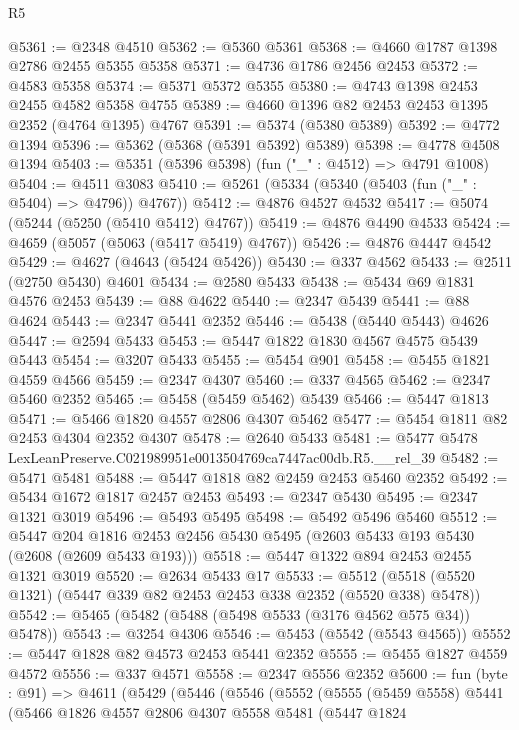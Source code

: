 \begin{lexlean}{R5}
\begin{coremodule}
@5361 := @2348 @4510
@5362 := @5360 @5361
@5368 := @4660 @1787 @1398 @2786 @2455 @5355 @5358
@5371 := @4736 @1786 @2456 @2453
@5372 := @4583 @5358
@5374 := @5371 @5372 @5355
@5380 := @4743 @1398 @2453 @2455 @4582 @5358 @4755
@5389 := @4660 @1396 @82 @2453 @2453 @1395 @2352 (@4764 @1395) @4767
@5391 := @5374 (@5380 @5389)
@5392 := @4772 @1394
@5396 := @5362 (@5368 (@5391 @5392) @5389)
@5398 := @4778 @4508 @1394
@5403 := @5351 (@5396 @5398) (fun ("_" : @4512) => @4791 @1008)
@5404 := @4511 @3083
@5410 := @5261 (@5334 (@5340 (@5403 (fun ("_" : @5404) => @4796)) @4767))
@5412 := @4876 @4527 @4532
@5417 := @5074 (@5244 (@5250 (@5410 @5412) @4767))
@5419 := @4876 @4490 @4533
@5424 := @4659 (@5057 (@5063 (@5417 @5419) @4767))
@5426 := @4876 @4447 @4542
@5429 := @4627 (@4643 (@5424 @5426))
@5430 := @337 @4562
@5433 := @2511 (@2750 @5430) @4601
@5434 := @2580 @5433
@5438 := @5434 @69 @1831 @4576 @2453
@5439 := @88 @4622
@5440 := @2347 @5439
@5441 := @88 @4624
@5443 := @2347 @5441 @2352
@5446 := @5438 (@5440 @5443) @4626
@5447 := @2594 @5433
@5453 := @5447 @1822 @1830 @4567 @4575 @5439 @5443
@5454 := @3207 @5433
@5455 := @5454 @901
@5458 := @5455 @1821 @4559 @4566
@5459 := @2347 @4307
@5460 := @337 @4565
@5462 := @2347 @5460 @2352
@5465 := @5458 (@5459 @5462) @5439
@5466 := @5447 @1813
@5471 := @5466 @1820 @4557 @2806 @4307 @5462
@5477 := @5454 @1811 @82 @2453 @4304 @2352 @4307
@5478 := @2640 @5433
@5481 := @5477 @5478 LexLeanPreserve.C021989951e0013504769ca7447ac00db.R5.__rel_39
@5482 := @5471 @5481
@5488 := @5447 @1818 @82 @2459 @2453 @5460 @2352
@5492 := @5434 @1672 @1817 @2457 @2453
@5493 := @2347 @5430
@5495 := @2347 @1321 @3019
@5496 := @5493 @5495
@5498 := @5492 @5496 @5460
@5512 := @5447
    @204
    @1816
    @2453
    @2456
    @5430
    @5495
    (@2603 @5433 @193 @5430 (@2608 (@2609 @5433 @193)))
@5518 := @5447 @1322 @894 @2453 @2455 @1321 @3019
@5520 := @2634 @5433 @17
@5533 := @5512 (@5518 (@5520 @1321) (@5447 @339 @82 @2453 @2453 @338 @2352 (@5520 @338) @5478))
@5542 := @5465 (@5482 (@5488 (@5498 @5533 (@3176 @4562 @575 @34)) @5478))
@5543 := @3254 @4306
@5546 := @5453 (@5542 (@5543 @4565))
@5552 := @5447 @1828 @82 @4573 @2453 @5441 @2352
@5555 := @5455 @1827 @4559 @4572
@5556 := @337 @4571
@5558 := @2347 @5556 @2352
@5600 := fun (byte : @91) =>
  @4611
    (@5429
      (@5446
        (@5546
          (@5552
            (@5555
              (@5459 @5558)
              @5441
              (@5466
                @1826
                @4557
                @2806
                @4307
                @5558
                @5481
                (@5447
                  @1824

\end{coremodule}
\end{lexlean}
